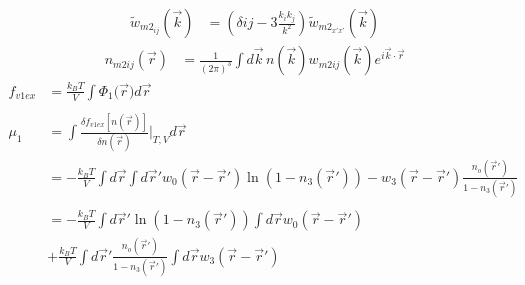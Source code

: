 \documentclass[double,12pt]{beavtex}
\begin{document}
\begin{align}
    \widetilde{w}_{m2_{ij}}(\vec{k}) &= (\delta{ij}-3\frac{k_ik_j}{k^2})
                                    \widetilde{w}_{{m2}_{x'x'}}(\vec{k})
\end{align}
\begin{align}
    n_{m2ij}(\vec r) &=  \frac{1}{\left(2\pi\right)^3}\int d\vec k\, 
                       n(\vec k) w_{m2ij}(\vec k)e^{i\vec k\cdot \vec r}
\end{align} 
\begin{align}
    f_{v1ex} &= \frac{k_BT}{V}\int \Phi_1(\vec{r}{) d}\vec{r}  \\ \nonumber\\
    \mu_1 &= \int \frac{\delta f_{v1ex}[n(\vec r)]}{\delta n(\vec r)}\bigg|_{T,V} d\vec{r} \\
          &= -\frac{k_BT}{V} \int d\vec r \int d \vec r' w_0(\vec r - \vec r')
              \ln(1-n_3(\vec r')) - w_3(\vec r - \vec r')\frac{n_o(\vec r')}{1-n_3(\vec r')} \\ \nonumber\\
          &= -\frac{k_BT}{V} \int d\vec r' \ln(1-n_3(\vec r')) \int d \vec r  w_0(\vec r - \vec r') \nonumber\\
          &+ \frac{k_BT}{V} \int d\vec r' \frac{n_o(\vec r')}{1-n_3(\vec r')} \int d \vec r  w_3(\vec r - \vec r')
\end{align}
\end{document}
